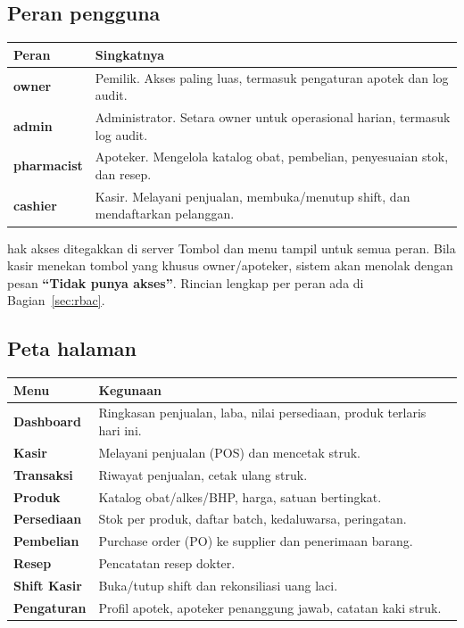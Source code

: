 \documentclass[11pt,a4paper]{article}
\begin{document}
\subsection{Peran pengguna}

\begin{tabularx}{\textwidth}{@{}L{2.6cm}Y@{}}
  \toprule
  \textbf{Peran} & \textbf{Singkatnya} \\
  \midrule
  \textbf{owner}      & Pemilik. Akses paling luas, termasuk pengaturan apotek dan log audit. \\
  \textbf{admin}      & Administrator. Setara owner untuk operasional harian, termasuk log audit. \\
  \textbf{pharmacist} & Apoteker. Mengelola katalog obat, pembelian, penyesuaian stok, dan resep. \\
  \textbf{cashier}    & Kasir. Melayani penjualan, membuka/menutup shift, dan mendaftarkan pelanggan. \\
  \bottomrule
\end{tabularx}

\begin{warnbox}{hak akses ditegakkan di server}
Tombol dan menu tampil untuk semua peran. Bila kasir menekan tombol yang
khusus owner/apoteker, sistem akan menolak dengan pesan \textbf{``Tidak punya
akses''}. Rincian lengkap per peran ada di Bagian~\ref{sec:rbac}.
\end{warnbox}

\subsection{Peta halaman}

\begin{tabularx}{\textwidth}{@{}L{3.4cm}Y@{}}
  \toprule
  \textbf{Menu} & \textbf{Kegunaan} \\
  \midrule
  \textbf{Dashboard}    & Ringkasan penjualan, laba, nilai persediaan, produk terlaris hari ini. \\
  \textbf{Kasir}        & Melayani penjualan (POS) dan mencetak struk. \\
  \textbf{Transaksi}    & Riwayat penjualan, cetak ulang struk. \\
  \textbf{Produk}       & Katalog obat/alkes/BHP, harga, satuan bertingkat. \\
  \textbf{Persediaan}   & Stok per produk, daftar batch, kedaluwarsa, peringatan. \\
  \textbf{Pembelian}    & Purchase order (PO) ke supplier dan penerimaan barang. \\
  \textbf{Resep}        & Pencatatan resep dokter. \\
  \textbf{Shift Kasir}  & Buka/tutup shift dan rekonsiliasi uang laci. \\
  \textbf{Pengaturan}   & Profil apotek, apoteker penanggung jawab, catatan kaki struk. \\
  \bottomrule
\end{tabularx}
\end{document}
